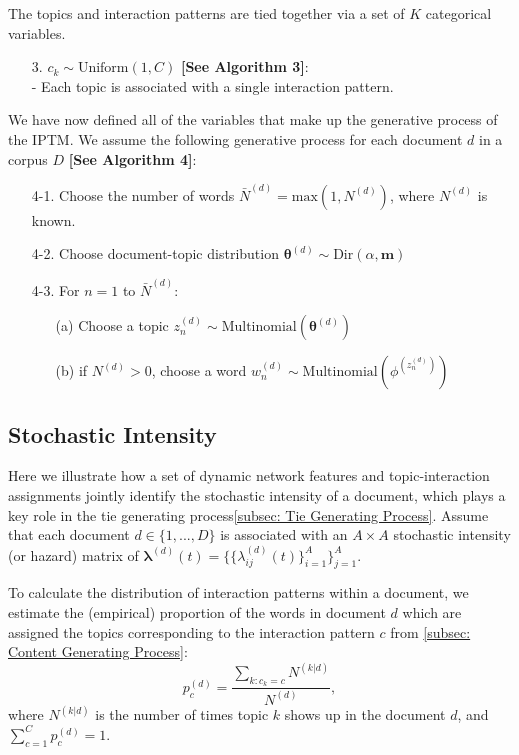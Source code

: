 \documentclass[a4paper]{article}
\begin{document}
\noindent The topics and interaction patterns are tied together via a set of $K$ categorical variables.
\begin{itemize}
	\item[3.] $c_k\sim \mbox{Uniform}(1, C)$ \textbf{[See Algorithm 3]}: \\
	- Each topic is associated with a single interaction pattern.\\
\end{itemize}
\noindent We have now defined all of the variables that make up the generative process of the IPTM. We assume the following generative process for each document $d$ in a corpus $D$ \textbf{[See Algorithm 4]}:
\begin{itemize}
	\item[4-1.] Choose the number of words $\bar N^{(d)} = \mbox{max}(1,  N^{(d)})$, where $N^{(d)}$ is known.
	\item[4-2.] Choose document-topic distribution $\boldsymbol{\theta}^{(d)}\sim \mbox{Dir}(\alpha, \boldsymbol{m})$
	\item[4-3.] For $n=1$ to $\bar N^{(d)}$:
	\begin{itemize}
		\item[(a)] Choose a topic $z_n^{(d)} \sim \mbox{Multinomial}(\boldsymbol{\theta}^{(d)})$
		\item[(b)] if $N^{(d)}>0$, choose a word $w_n^{(d)} \sim\mbox{Multinomial} (\phi^{(z_n^{(d)})})$
	\end{itemize}
\end{itemize}
\subsection{Stochastic Intensity} \label{subsec: Stochastic Intensity}
Here we illustrate how a set of dynamic network features and topic-interaction assignments  jointly identify the stochastic intensity of a document, which plays a key role in the tie generating process\ref{subsec: Tie Generating Process}. Assume that each document $d \in \{1,...,D\}$ is associated with an $A\times A$ stochastic intensity (or hazard) matrix of $\boldsymbol{\lambda}^{(d)}(t) = \{\{\lambda^{(d)}_{ij}(t)\}_{i=1}^{A}\}_{j=1}^{A}$.  

To calculate the distribution of interaction patterns within a document, we estimate the (empirical) proportion of the words in document $d$ which are assigned the topics corresponding to the interaction pattern $c$ from \ref{subsec: Content Generating Process}: 
\begin{equation}
p_c^{(d)} = \frac{\sum\limits_{k: c_k=c} N^{(k|d)}}{N^{(d)}},
\end{equation}
where $N^{(k|d)}$ is the number of times topic $k$ shows up in the document $d$, and $\sum\limits_{c=1}^{C}p_c^{(d)}=1$.
\end{document}
